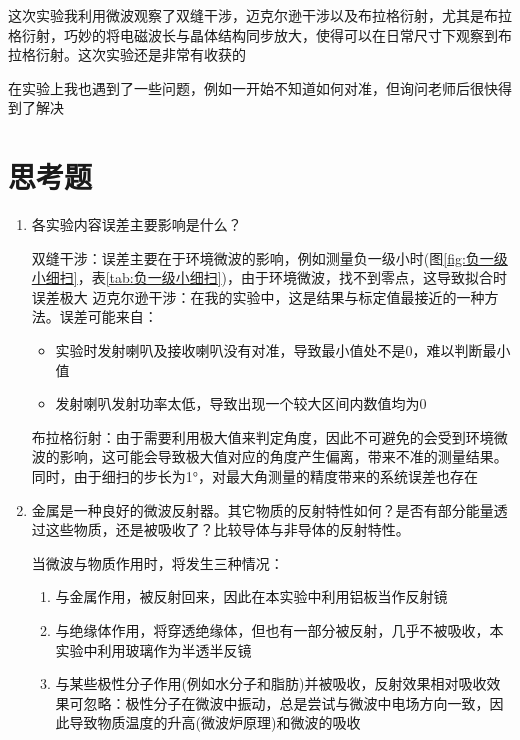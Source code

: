 \documentclass[11pt]{article}
\begin{document}
	这次实验我利用微波观察了双缝干涉，迈克尔逊干涉以及布拉格衍射，尤其是布拉格衍射，巧妙的将电磁波长与晶体结构同步放大，使得可以在日常尺寸下观察到布拉格衍射。这次实验还是非常有收获的
	
	在实验上我也遇到了一些问题，例如一开始不知道如何对准，但询问老师后很快得到了解决
	
	
	
	\section{思考题}
	\begin{enumerate}
		\item 各实验内容误差主要影响是什么？\newline
		
		双缝干涉：误差主要在于环境微波的影响，例如测量负一级小时(图\ref{fig:负一级小细扫}，表\ref{tab:负一级小细扫})，由于环境微波，找不到零点，这导致拟合时误差极大\newline
		迈克尔逊干涉：在我的实验中，这是结果与标定值最接近的一种方法。误差可能来自：
		\begin{itemize}
			\item 实验时发射喇叭及接收喇叭没有对准，导致最小值处不是0，难以判断最小值
			\item 发射喇叭发射功率太低，导致出现一个较大区间内数值均为0
		\end{itemize}\newline
		布拉格衍射：由于需要利用极大值来判定角度，因此不可避免的会受到环境微波的影响，这可能会导致极大值对应的角度产生偏离，带来不准的测量结果。同时，由于细扫的步长为1°，对最大角测量的精度带来的系统误差也存在
		\item 金属是一种良好的微波反射器。其它物质的反射特性如何？是否有部分能量透过这些物质，还是被吸收了？比较导体与非导体的反射特性。\newline
		
		当微波与物质作用时，将发生三种情况：
		\begin{enumerate}
			\item 与金属作用，被反射回来，因此在本实验中利用铝板当作反射镜
			\item 与绝缘体作用，将穿透绝缘体，但也有一部分被反射，几乎不被吸收，本实验中利用玻璃作为半透半反镜
			\item 与某些极性分子作用(例如水分子和脂肪)并被吸收，反射效果相对吸收效果可忽略：极性分子在微波中振动，总是尝试与微波中电场方向一致，因此导致物质温度的升高(微波炉原理)和微波的吸收
		\end{enumerate}
		

\end{enumerate}
\end{document}
